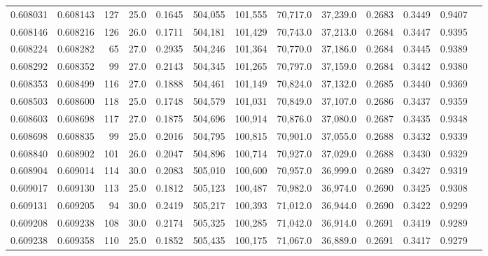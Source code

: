 \begin{tabular}{rrrrrrrrrrrrr}
0.608031 & 0.608143 &   127 & 25.0 &                                     0.1645 & 504,055 & 101,555 &  70,717.0 &  37,239.0 & 0.2683 & 0.3449 & 0.9407 \\
0.608146 & 0.608216 &   126 & 26.0 &                                     0.1711 & 504,181 & 101,429 &  70,743.0 &  37,213.0 & 0.2684 & 0.3447 & 0.9395 \\
0.608224 & 0.608282 &    65 & 27.0 &                                     0.2935 & 504,246 & 101,364 &  70,770.0 &  37,186.0 & 0.2684 & 0.3445 & 0.9389 \\
0.608292 & 0.608352 &    99 & 27.0 &                                     0.2143 & 504,345 & 101,265 &  70,797.0 &  37,159.0 & 0.2684 & 0.3442 & 0.9380 \\
0.608353 & 0.608499 &   116 & 27.0 &                                     0.1888 & 504,461 & 101,149 &  70,824.0 &  37,132.0 & 0.2685 & 0.3440 & 0.9369 \\
0.608503 & 0.608600 &   118 & 25.0 &                                     0.1748 & 504,579 & 101,031 &  70,849.0 &  37,107.0 & 0.2686 & 0.3437 & 0.9359 \\
0.608603 & 0.608698 &   117 & 27.0 &                                     0.1875 & 504,696 & 100,914 &  70,876.0 &  37,080.0 & 0.2687 & 0.3435 & 0.9348 \\
0.608698 & 0.608835 &    99 & 25.0 &                                     0.2016 & 504,795 & 100,815 &  70,901.0 &  37,055.0 & 0.2688 & 0.3432 & 0.9339 \\
0.608840 & 0.608902 &   101 & 26.0 &                                     0.2047 & 504,896 & 100,714 &  70,927.0 &  37,029.0 & 0.2688 & 0.3430 & 0.9329 \\
0.608904 & 0.609014 &   114 & 30.0 &                                     0.2083 & 505,010 & 100,600 &  70,957.0 &  36,999.0 & 0.2689 & 0.3427 & 0.9319 \\
0.609017 & 0.609130 &   113 & 25.0 &                                     0.1812 & 505,123 & 100,487 &  70,982.0 &  36,974.0 & 0.2690 & 0.3425 & 0.9308 \\
0.609131 & 0.609205 &    94 & 30.0 &                                     0.2419 & 505,217 & 100,393 &  71,012.0 &  36,944.0 & 0.2690 & 0.3422 & 0.9299 \\
0.609208 & 0.609238 &   108 & 30.0 &                                     0.2174 & 505,325 & 100,285 &  71,042.0 &  36,914.0 & 0.2691 & 0.3419 & 0.9289 \\
0.609238 & 0.609358 &   110 & 25.0 &                                     0.1852 & 505,435 & 100,175 &  71,067.0 &  36,889.0 & 0.2691 & 0.3417 & 0.9279 \\

\end{tabular}

